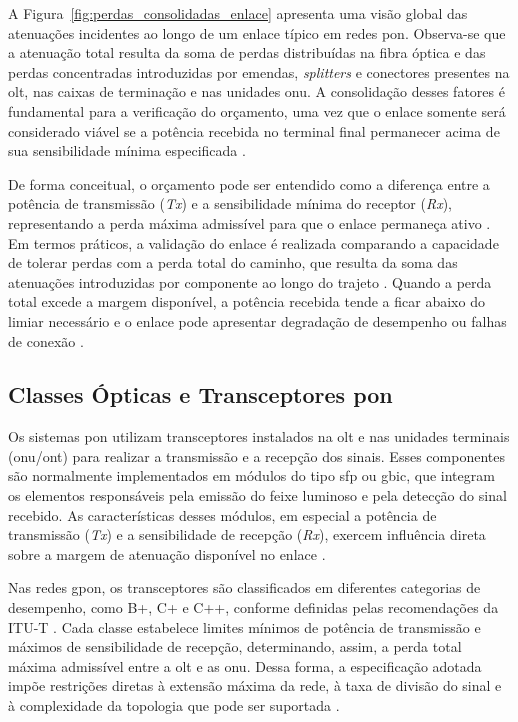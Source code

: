 A Figura~\ref{fig:perdas_consolidadas_enlace} apresenta uma visão global das atenuações incidentes ao longo de um enlace típico em redes \gls{pon}. Observa-se que a atenuação total resulta da soma de perdas distribuídas na fibra óptica e das perdas concentradas introduzidas por emendas, \textit{splitters} e conectores presentes na \gls{olt}, nas caixas de terminação e nas unidades \gls{onu}. A consolidação desses fatores é fundamental para a verificação do orçamento, uma vez que o enlace somente será considerado viável se a potência recebida no terminal final permanecer acima de sua sensibilidade mínima especificada \cite{keiser2011pon,holight_optical_budget}.

De forma conceitual, o orçamento pode ser entendido como a diferença entre a potência de transmissão (\textit{Tx}) e a sensibilidade mínima do receptor (\textit{Rx}), representando a perda máxima admissível para que o enlace permaneça ativo \cite{holight_optical_budget}. Em termos práticos, a validação do enlace é realizada comparando a capacidade de tolerar perdas com a perda total do caminho, que resulta da soma das atenuações introduzidas por componente ao longo do trajeto \cite{apnic_gpon_budget}. Quando a perda total excede a margem disponível, a potência recebida tende a ficar abaixo do limiar necessário e o enlace pode apresentar degradação de desempenho ou falhas de conexão \cite{holight_optical_budget}.

\subsection{Classes Ópticas e Transceptores \gls{pon}}

Os sistemas \gls{pon} utilizam transceptores instalados na \gls{olt} e nas unidades terminais (\gls{onu}/\gls{ont}) para realizar a transmissão e a recepção dos sinais. Esses componentes são normalmente implementados em módulos do tipo \gls{sfp} ou \gls{gbic}, que integram os elementos responsáveis pela emissão do feixe luminoso e pela detecção do sinal recebido. As características desses módulos, em especial a potência de transmissão (\textit{Tx}) e a sensibilidade de recepção (\textit{Rx}), exercem influência direta sobre a margem de atenuação disponível no enlace \cite{keiser2011pon,itutg9842}.

Nas redes \gls{gpon}, os transceptores são classificados em diferentes categorias de desempenho, como B+, C+ e C++, conforme definidas pelas recomendações da ITU-T \cite{itutg9842}. Cada classe estabelece limites mínimos de potência de transmissão e máximos de sensibilidade de recepção, determinando, assim, a perda total máxima admissível entre a \gls{olt} e as \gls{onu}. Dessa forma, a especificação adotada impõe restrições diretas à extensão máxima da rede, à taxa de divisão do sinal e à complexidade da topologia que pode ser suportada \cite{itutg9841,itutg9842}.

